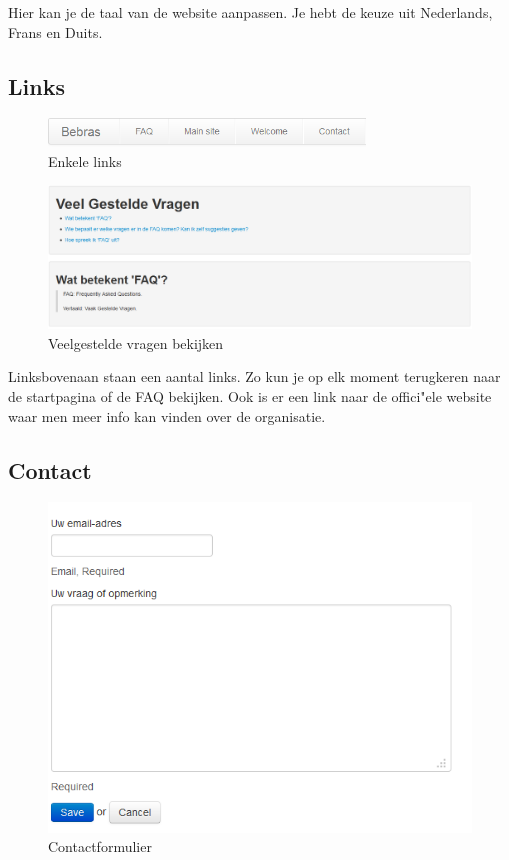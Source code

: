 \documentclass[]{article}
\begin{document}
Hier kan je de taal van de website aanpassen. Je hebt de keuze uit Nederlands, Frans en Duits.

\subsection{Links}

\begin{figure}[!ht]
	\centering
	\includegraphics[width=0.75\textwidth]{img/links}
	\caption{Enkele links}
	\label{links}
\end{figure}

\begin{figure}[!ht]
	\centering
	\includegraphics[width=1\textwidth]{img/faq}
	\caption{Veelgestelde vragen bekijken}
	\label{faq}
\end{figure}

Linksbovenaan staan een aantal links. Zo kun je op elk moment terugkeren naar de startpagina of de FAQ bekijken. Ook is er een link naar de offici"ele website waar men meer info kan vinden over de organisatie.

\subsection{Contact}

\begin{figure}[!ht]
	\centering
	\includegraphics[width=1\textwidth]{img/contact}
	\caption{Contactformulier}
	\label{contact}
\end{figure}
\end{document}
